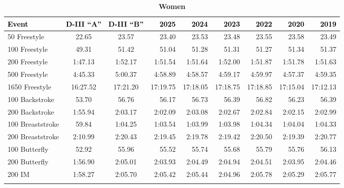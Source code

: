 \begin{table}[H]
\centering
\caption*{\textbf{\textcolor{teamprimary}{Women}}}
\renewcommand{\arraystretch}{1.2}
\scriptsize
\begin{tabularx}{\textwidth}{lccrrrrrr}
\toprule
\rowcolor{teamprimary!25}
\textbf{\textcolor{black}{Event}} & \textbf{\textcolor{black}{D-III ``A''}} & \textbf{\textcolor{black}{D-III ``B''}} & \textbf{\textcolor{black}{2025}} & \textbf{\textcolor{black}{2024}} & \textbf{\textcolor{black}{2023}} & \textbf{\textcolor{black}{2022}} & \textbf{\textcolor{black}{2020}} & \textbf{\textcolor{black}{2019}} \\
\midrule
\rowcolor{teamsecondary!12}
50 Freestyle & 22.65 & 23.57 & 23.40 & 23.53 & 23.48 & 23.55 & 23.58 & 23.49 \\
\rowcolor{teamprimary!8}
100 Freestyle & 49.31 & 51.42 & 51.04 & 51.28 & 51.31 & 51.27 & 51.34 & 51.37 \\
\rowcolor{teamsecondary!12}
200 Freestyle & 1:47.13 & 1:52.17 & 1:51.54 & 1:51.64 & 1:52.00 & 1:51.87 & 1:51.78 & 1:51.63 \\
\rowcolor{teamprimary!8}
500 Freestyle & 4:45.33 & 5:00.37 & 4:58.89 & 4:58.57 & 4:59.17 & 4:59.97 & 4:57.37 & 4:59.35 \\
\rowcolor{teamsecondary!12}
1650 Freestyle & 16:27.52 & 17:21.20 & 17:19.75 & 17:18.05 & 17:18.75 & 17:18.85 & 17:15.04 & 17:12.13 \\
\rowcolor{teamprimary!8}
100 Backstroke & 53.70 & 56.76 & 56.17 & 56.73 & 56.39 & 56.82 & 56.23 & 56.39 \\
\rowcolor{teamsecondary!12}
200 Backstroke & 1:55.94 & 2:03.17 & 2:02.09 & 2:03.08 & 2:02.67 & 2:02.84 & 2:02.15 & 2:02.99 \\
\rowcolor{teamprimary!8}
100 Breaststroke & 59.84 & 1:04.25 & 1:03.54 & 1:03.99 & 1:03.98 & 1:04.34 & 1:04.04 & 1:04.33 \\
\rowcolor{teamsecondary!12}
200 Breaststroke & 2:10.99 & 2:20.43 & 2:19.45 & 2:19.78 & 2:19.42 & 2:20.50 & 2:19.39 & 2:20.77 \\
\rowcolor{teamprimary!8}
100 Butterfly & 52.92 & 55.96 & 55.52 & 55.74 & 55.68 & 55.79 & 55.76 & 56.13 \\
\rowcolor{teamsecondary!12}
200 Butterfly & 1:56.90 & 2:05.01 & 2:03.93 & 2:04.49 & 2:04.94 & 2:04.51 & 2:03.95 & 2:04.46 \\
\rowcolor{teamprimary!8}
200 IM & 1:58.27 & 2:05.70 & 2:05.42 & 2:05.44 & 2:04.96 & 2:05.78 & 2:05.29 & 2:05.77 \\
\rowcolor{teamsecondary!12}

\end{tabularx}
\end{table}
